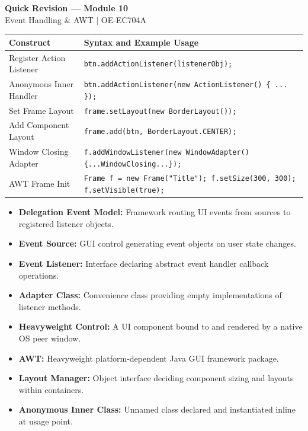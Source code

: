 \documentclass[12pt,a4paper]{article}
\renewcommand{\arraystretch}{1.45}
\begin{document}
\newpage
\begin{center}
  {\large\bfseries\color{myred} Quick Revision --- Module 10}\\[3pt]
  {\small\color{mydark} Event Handling \& AWT $|$ OE-EC704A}
\end{center}
\noindent{\color{myred}\rule{\linewidth}{1.2pt}}
\vspace{4pt}

\begin{tcolorbox}[formulabox, title={\textbf{Event \& Layout Syntax}}]
{\renewcommand{\arraystretch}{1.3}%
\begin{tabularx}{\linewidth}{l Y}
\textbf{Construct} & \textbf{Syntax and Example Usage} \\
\hline
Register Action Listener & \texttt{btn.addActionListener(listenerObj);} \\
Anonymous Inner Handler & \texttt{btn.addActionListener(new ActionListener() \{ ... \});} \\
Set Frame Layout & \texttt{frame.setLayout(new BorderLayout());} \\
Add Component Layout & \texttt{frame.add(btn, BorderLayout.CENTER);} \\
Window Closing Adapter & \texttt{f.addWindowListener(new WindowAdapter()\{...WindowClosing...\});} \\
AWT Frame Init & \texttt{Frame f = new Frame("Title"); f.setSize(300, 300); f.setVisible(true);} \\
\end{tabularx}}
\end{tcolorbox}

\begin{tcolorbox}[defbox, title={\textbf{One-Line Definitions}}]
\begin{itemize}[leftmargin=*, itemsep=2pt]
  \item \textbf{Delegation Event Model:} Framework routing UI events from sources to registered listener objects.
  \item \textbf{Event Source:} GUI control generating event objects on user state changes.
  \item \textbf{Event Listener:} Interface declaring abstract event handler callback operations.
  \item \textbf{Adapter Class:} Convenience class providing empty implementations of listener methods.
  \item \textbf{Heavyweight Control:} A UI component bound to and rendered by a native OS peer window.
  \item \textbf{AWT:} Heavyweight platform-dependent Java GUI framework package.
  \item \textbf{Layout Manager:} Object interface deciding component sizing and layouts within containers.
  \item \textbf{Anonymous Inner Class:} Unnamed class declared and instantiated inline at usage point.
\end{itemize}
\end{tcolorbox}
\end{document}
